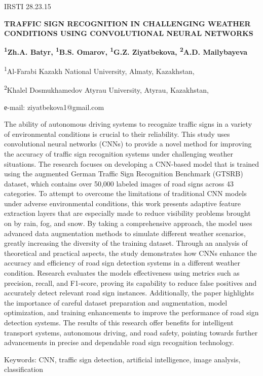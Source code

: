 IRSTI 28.23.15

{\bfseries TRAFFIC SIGN RECOGNITION IN CHALLENGING WEATHER CONDITIONS USING
CONVOLUTIONAL NEURAL NETWORKS}

{\bfseries \textsuperscript{1}Zh.A. Batyr, \textsuperscript{1}B.S. Omarov,
\textsuperscript{1}G.Z. Ziyatbekova, \textsuperscript{2}A.D.
Mailybayeva}

\textsuperscript{1}Al-Farabi Kazakh National University, Almaty,
Kazakhstan,

\textsuperscript{2}Khalel Dosmukhamedov Atyrau University, Atyrau,
Kazakhstan,

е-mail: ziyatbekova1@gmail.com

The ability of autonomous driving systems to recognize traffic signs in
a variety of environmental conditions is crucial to their reliability.
This study uses convolutional neural networks (CNNs) to provide a novel
method for improving the accuracy of traffic sign recognition systems
under challenging weather situations. The research focuses on developing
a CNN-based model that is trained using the augmented German Traffic
Sign Recognition Benchmark (GTSRB) dataset, which contains over 50,000
labeled images of road signs across 43 categories. To attempt to
overcome the limitations of traditional CNN models under adverse
environmental conditions, this work presents adaptive feature extraction
layers that are especially made to reduce visibility problems brought on
by rain, fog, and snow. By taking a comprehensive approach, the model
uses advanced data augmentation methods to simulate different weather
scenarios, greatly increasing the diversity of the training dataset.
Through an analysis of theoretical and practical aspects, the study
demonstrates how CNNs enhance the accuracy and efficiency of road sign
detection systems in a different weather condition. Research evaluates
the model\textquotesingle s effectiveness using metrics such as
precision, recall, and F1-score, proving its capability to reduce false
positives and accurately detect relevant road sign instances.
Additionally, the paper highlights the importance of careful dataset
preparation and augmentation, model optimization, and training
enhancements to improve the performance of road sign detection systems.
The results of this research offer benefits for intelligent transport
systems, autonomous driving, and road safety, pointing towards further
advancements in precise and dependable road sign recognition technology.

Keywords: CNN, traffic sign detection, artificial intelligence, image
analysis, classification

